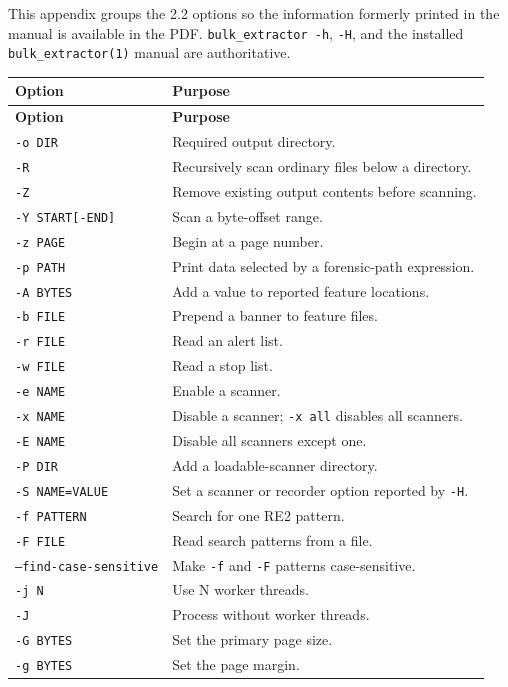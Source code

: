 \documentclass[11pt]{article}
\newcommand{\code}[1]{\texttt{#1}}
\begin{document}
This appendix groups the 2.2 options so the information formerly printed in
the manual is available in the PDF. \code{bulk\_extractor -h}, \code{-H}, and
the installed \code{bulk\_extractor(1)} manual are authoritative.

\begin{longtable}{p{.29\linewidth}p{.65\linewidth}}
\toprule
\textbf{Option} & \textbf{Purpose} \\
\midrule
\endfirsthead
\toprule
\textbf{Option} & \textbf{Purpose} \\
\midrule
\endhead
\code{-o DIR} & Required output directory. \\
\code{-R} & Recursively scan ordinary files below a directory. \\
\code{-Z} & Remove existing output contents before scanning. \\
\code{-Y START[-END]} & Scan a byte-offset range. \\
\code{-z PAGE} & Begin at a page number. \\
\code{-p PATH} & Print data selected by a forensic-path expression. \\
\code{-A BYTES} & Add a value to reported feature locations. \\
\code{-b FILE} & Prepend a banner to feature files. \\
\code{-r FILE} & Read an alert list. \\
\code{-w FILE} & Read a stop list. \\
\code{-e NAME} & Enable a scanner. \\
\code{-x NAME} & Disable a scanner; \code{-x all} disables all scanners. \\
\code{-E NAME} & Disable all scanners except one. \\
\code{-P DIR} & Add a loadable-scanner directory. \\
\code{-S NAME=VALUE} & Set a scanner or recorder option reported by \code{-H}. \\
\code{-f PATTERN} & Search for one RE2 pattern. \\
\code{-F FILE} & Read search patterns from a file. \\
\code{--find-case-sensitive} & Make \code{-f} and \code{-F} patterns case-sensitive. \\
\code{-j N} & Use N worker threads. \\
\code{-J} & Process without worker threads. \\
\code{-G BYTES} & Set the primary page size. \\
\code{-g BYTES} & Set the page margin. \\

\end{longtable}
\end{document}
